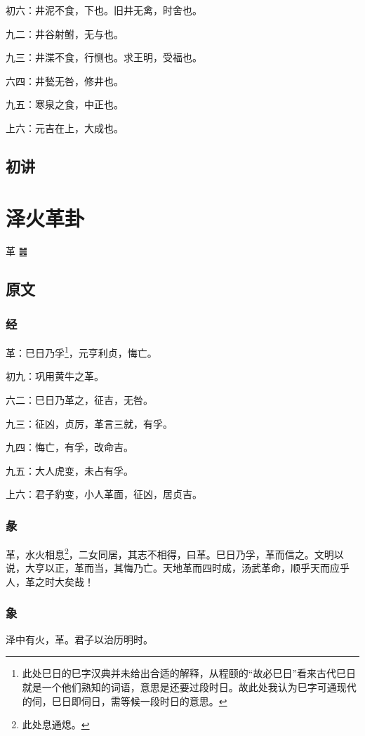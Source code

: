 \documentclass[12pt,oneside]{book}
\begin{document}
初六：井泥不食，下也。旧井无禽，时舍也。

九二：井谷射鲋，无与也。

九三：井渫不食，行恻也。求王明，受福也。

六四：井甃无咎，修井也。

九五：寒泉之食，中正也。

上六：元吉在上，大成也。

\section{初讲}



\chapter{泽火革卦}
革 {\Large ䷰}

\section{原文}

\subsection{经}
革：巳日乃孚\footnote{此处巳日的巳字汉典并未给出合适的解释，从程颐的“故必巳日”看来古代巳日就是一个他们熟知的词语，意思是还要过段时日。故此处我认为巳字可通现代的伺，巳日即伺日，需等候一段时日的意思。}，元亨利贞，悔亡。

初九：巩用黄牛之革。

六二：巳日乃革之，征吉，无咎。

九三：征凶，贞厉，革言三就，有孚。

九四：悔亡，有孚，改命吉。

九五：大人虎变，未占有孚。

上六：君子豹变，小人革面，征凶，居贞吉。

\subsection{彖}
革，水火相息\footnote{此处息通熄。}，二女同居，其志不相得，曰革。巳日乃孚，革而信之。文明以说，大亨以正，革而当，其悔乃亡。天地革而四时成，汤武革命，顺乎天而应乎人，革之时大矣哉！

\subsection{象}
泽中有火，革。君子以治历明时。
\end{document}
